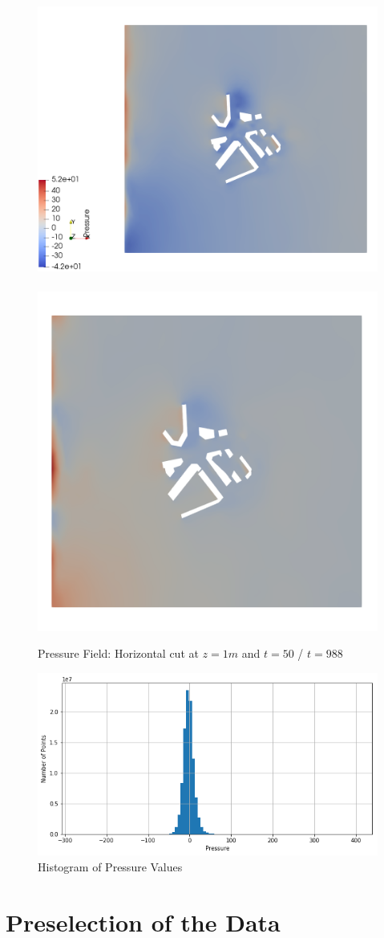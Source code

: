 \begin{figure}[h]
\centering
\includegraphics[height = 0.4 \textwidth]{figures/Analysis/pressure050cutZ1}
~
    \includegraphics[height = 0.4 \textwidth]{figures/Analysis/pressure988cutZ1}
    \caption{Pressure Field: Horizontal cut at $z=1m$ and $t=50$ / $t=988$ }
    \label{fig:pressure:viz988}
\end{figure}

\begin{figure}[h]
\centering
    \includegraphics[width = 0.6 \textwidth]{figures/DataAnalysis/HistoGramPressure}
    \caption{Histogram of Pressure Values}
    \label{fig:pressure:hist}
\end{figure}


\section{Preselection of the Data} \label{sec:preselection}
%
%
%

